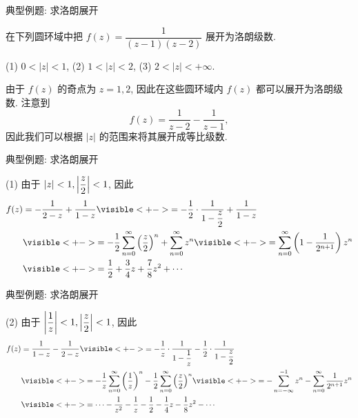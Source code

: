 \begin{frame}{典型例题: 求洛朗展开}
\begin{example}
在下列圆环域中把 $f(z)=\dfrac1{(z-1)(z-2)}$ 展开为洛朗级数.

\onslide<+->
(1) $0<|z|<1$, (2) $1<|z|<2$, (3) $2<|z|<+\infty$. 
\end{example}
\begin{solution}
由于 $f(z)$ 的奇点为 $z=1,2$, 因此在这些圆环域内 $f(z)$ 都可以展开为洛朗级数.
\onslide<+->
注意到
\[f(z)=\frac1{z-2}-\frac1{z-1},\]
因此我们可以根据 $|z|$ 的范围来将其展开成等比级数.
\end{solution}
\end{frame}


\begin{frame}{典型例题: 求洛朗展开}
\begin{solutionc}
(1) 由于 $|z|<1,\left|\dfrac z2\right|<1$,
\onslide<+->
因此
\begin{align*}
f(z)&=-\frac1{2-z}+\frac1{1-z}
\visible<+->{=-\frac12\cdot\frac1{1-\dfrac z2}+\frac1{1-z}}\\
&\visible<+->{=-\frac12\sum_{n=0}^\infty\left(\frac z2\right)^n+\sum_{n=0}^\infty z^n}
\visible<+->{=\sum_{n=0}^\infty\left(1-\frac1{2^{n+1}}\right)z^n}\\
&\visible<+->{=\frac12+\frac34z+\frac78z^2+\cdots}
\end{align*}
\end{solutionc}
\end{frame}


\begin{frame}{典型例题: 求洛朗展开}
\begin{solutionc}
(2) 由于 $\left|\dfrac1z\right|<1,\left|\dfrac z2\right|<1$, 
\onslide<+->
因此
\begin{align*}
f(z)&=\frac1{1-z}-\frac1{2-z}
\visible<+->{=-\frac1z\cdot\frac1{1-\dfrac1z}-\frac12\cdot\frac1{1-\dfrac z2}}\\
&\visible<+->{=-\frac1z\sum_{n=0}^\infty \left(\frac1z\right)^n-\frac12\sum_{n=0}^\infty\left(\frac z2\right)^n}
\visible<+->{=-\sum_{n=-\infty}^{-1}z^n-\sum_{n=0}^\infty\frac1{2^{n+1}}z^n}\\
&\visible<+->{=\cdots-\frac1{z^2}-\frac1z-\frac12-\frac14z-\frac18z^2-\cdots}
\end{align*}
\end{solutionc}
\end{frame}


